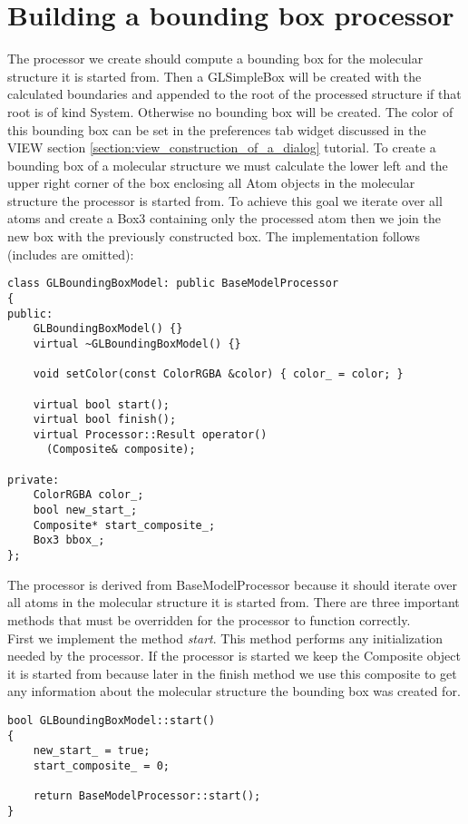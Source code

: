 \section{Building a bounding box processor}
\label{section:bounding_box_processor}

The processor we create should compute a bounding box for the molecular structure
it is started from. Then a GLSimpleBox will be created with the calculated
boundaries and appended to the root of the processed structure if that root is
of kind System. Otherwise no bounding box will be created. The color of this
bounding box can be set in the preferences tab widget discussed in the VIEW section 
\ref{section:view_construction_of_a_dialog} tutorial.
To create a bounding box of a molecular structure we must calculate the lower left 
and the upper right corner of the box enclosing all Atom objects in the molecular
structure the processor is started from. To achieve this goal we iterate over all atoms
and create a Box3 containing only the processed atom then we join the new box
with the previously constructed box.
The implementation follows (includes are omitted):

\begin{verbatim}
class GLBoundingBoxModel: public BaseModelProcessor
{
public:
	GLBoundingBoxModel() {}
	virtual ~GLBoundingBoxModel() {}

	void setColor(const ColorRGBA &color) { color_ = color; }

	virtual bool start();
	virtual bool finish();
	virtual Processor::Result operator() 
	  (Composite& composite);

private:
	ColorRGBA color_;
	bool new_start_;
	Composite* start_composite_;
	Box3 bbox_;
};
\end{verbatim}

The processor is derived from BaseModelProcessor because
it should iterate over all atoms in the molecular structure it is started from.
There are three important methods that must be overridden for the processor
to function correctly.\\
First we implement the method {\em start}. This method performs any initialization
needed by the processor. If the processor is started we keep the Composite object
it is started from because later in the finish method we use this composite to get
any information about the molecular structure the bounding box was created for.

\begin{verbatim}
bool GLBoundingBoxModel::start()
{
	new_start_ = true;
	start_composite_ = 0;

	return BaseModelProcessor::start();
}
\end{verbatim}

